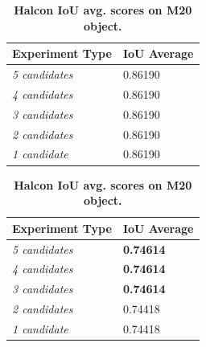 \begin{table}[!hbt]
\parbox{.45\linewidth}{
	\centering
    \begin{tabular}{| l | l |}
    \hline
    \textbf{Experiment Type} & \textbf{IoU Average} \\ \hline
    \emph{5 candidates} & 0.86190 \\
    \emph{4 candidates} & 0.86190 \\
    \emph{3 candidates} & 0.86190 \\
    \emph{2 candidates} & 0.86190 \\
    \emph{1 candidate} & 0.86190 \\
    \hline
    \end{tabular}
    \caption{\textbf{Halcon IoU avg. scores on Distance\_tube object.}}
    \label{tab:halcon_distance_tube_results}
}
\hfill
\parbox{.45\linewidth}{
	\centering
    \begin{tabular}{| l | l |}
    \hline
    \textbf{Experiment Type} & \textbf{IoU Average} \\ \hline
    \emph{5 candidates} & \textbf{0.74614} \\
    \emph{4 candidates} & \textbf{0.74614} \\
    \emph{3 candidates} & \textbf{0.74614} \\
    \emph{2 candidates} & 0.74418\\
    \emph{1 candidate} & 0.74418\\
    \hline
    \end{tabular}
    \caption{\textbf{Halcon IoU avg. scores on M20 object.}}
    \label{tab:halcon_M20_results}
}
\end{table}

